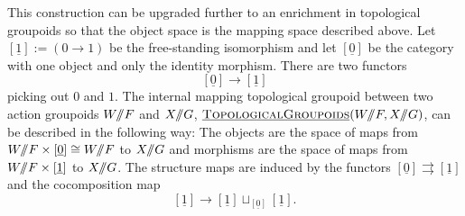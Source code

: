 This construction can be upgraded further to an enrichment in topological groupoids so that the object space is the mapping space described above. Let \([\underline{1}] := (0 \rightarrow 1)\) be the free-standing isomorphism and let \([\underline{0}]\) be the category with one object and only the identity morphism. There are two functors 
\[
[\underline{0}] \rightarrow [\underline{1}]
\]
picking out \(0\) and \(1\). The internal mapping topological groupoid between two action groupoids \(W /\!\!/ F\) and \(X/\!\!/ G\), \(\operatorname{\underline{\smash{\normalfont\textsc{TopologicalGroupoids}}}}(W /\!\!/ F, X /\!\!/ G)\), can be described in the following way: The objects are the space of maps from \(W /\!\!/ F \times [\underline{0}] \cong W /\!\!/ F\) to \(X /\!\!/ G\) and morphisms are the space of maps from \(W /\!\!/ F \times [\underline{1}]\) to \(X /\!\!/ G\). The structure maps are induced by the functors \([\underline{0}] \rightrightarrows [\underline{1}]\) and the cocomposition map
\[
[\underline{1}] \rightarrow [\underline{1}] \sqcup_{[\underline{0}]} [\underline{1}].
\]
%

